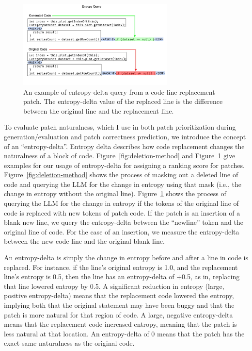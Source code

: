 \documentclass[12pt,openany,oneside,table]{cmuthesis}
\begin{document}
\begin{figure}
  \includegraphics[width=0.7\textwidth]{figures/approach/entropy_query.pdf}
  \caption{An example of entropy-delta query from a code-line replacement patch. The entropy-delta value of the replaced line is the difference between the original line and the replacement line.}
  \label{fig:replacement-method}
\end{figure}

To evaluate patch naturalness, which I use in both patch prioritization during
generation/evaluation and patch correctness prediction, we introduce the concept of an
``entropy-delta''. Entropy delta describes how code replacement changes the naturalness
of a block of code. Figure~\ref{fig:deletion-method} and
Figure~\ref{fig:replacement-method} give examples for our usage of entropy-delta
for assigning a ranking score for patches. Figure~\ref{fig:deletion-method}
shows the process of masking out a deleted line of code and querying the LLM for
the change in entropy using that mask (i.e., the change in entropy without the original line). Figure~\ref{fig:replacement-method} shows
the process of querying the LLM for the change in entropy if the tokens of the
original line of code is replaced with new tokens of patch code. If the patch is
an insertion of a blank new line, we query the entropy-delta between the ``newline'' token and the original line of code.
For the case of an insertion, we measure the entropy-delta between the new code line and the original blank line.

An entropy-delta is simply the change in entropy before and after a line in code
is replaced. For instance, if the line's original entropy is 1.0, and the
replacement line's entropy is 0.5, then the line has an entropy-delta of +0.5,
as in, replacing that line lowered entropy by 0.5. A significant reduction in
entropy (large, positive entropy-delta) means that the replacement code lowered
the entropy, implying both that the original statement may have been buggy and
that the patch is more natural for that region of code. A large, negative
entropy-delta means that the replacement code increased entropy, meaning that
the patch is less natural at that location. An entropy-delta of 0 means that the
patch has the exact same naturalness as the original code.
\end{document}
